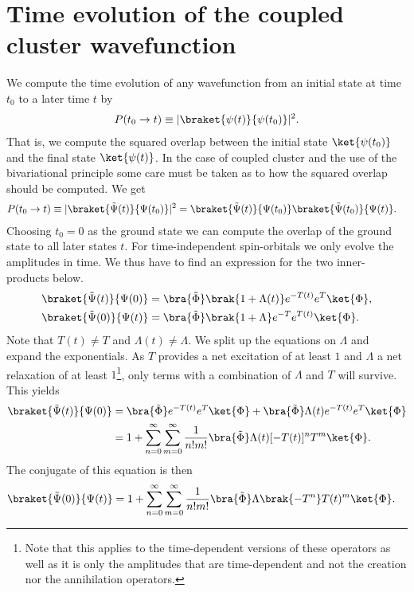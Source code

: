 \chapter{Time evolution of the coupled cluster wavefunction}
    We compute the time evolution of any wavefunction from an initial state at
    time $t_0$ to a later time $t$ by
    \begin{align}
        P(t_0 \to t)
        \equiv |\braket{\psi(t)}{\psi(t_0)}|^2.
    \end{align}
    That is, we compute the squared overlap between the initial state
    $\ket{\psi(t_0)}$ and the final state $\ket{\psi(t)}$. In the case of
    coupled cluster and the use of the bivariational principle some care must be
    taken as to how the squared overlap should be computed. We get
    \begin{align}
        P(t_0 \to t)
        &\equiv |\braket{\tilde{\Psi}(t)}{\Psi(t_0)}|^2
        = \braket{\tilde{\Psi}(t)}{\Psi(t_0)}
        \braket{\tilde{\Psi}(t_0)}{\Psi(t)}.
    \end{align}
    Choosing $t_0 = 0$ as the ground state we can compute the overlap of the
    ground state to all later states $t$. For time-independent spin-orbitals we
    only evolve the amplitudes in time. We thus have to find an expression for
    the two inner-products below.
    \begin{align}
        \braket{\tilde{\Psi}(t)}{\Psi(0)}
        &=
        \bra{\tilde{\Phi}}\brak{1 + \Lambda(t)}e^{-T(t)}
        e^{T}\ket{\Phi},
        \\
        \braket{\tilde{\Psi}(0)}{\Psi(t)}
        &=
        \bra{\tilde{\Phi}}\brak{1 + \Lambda}e^{-T}
        e^{T(t)}\ket{\Phi}.
    \end{align}
    Note that $T(t) \neq T$ and $\Lambda(t) \neq \Lambda$.  We split up the
    equations on $\Lambda$ and expand the exponentials. As $T$ provides a net
    excitation of at least $1$ and $\Lambda$ a net relaxation of at least
    $1$\footnote{Note that this applies to the time-dependent versions of these
    operators as well as it is only the amplitudes that are time-dependent and
    not the creation nor the annihilation operators.}, only terms with a
    combination of $\Lambda$ and $T$ will survive. This yields
    \begin{align}
        \braket{\tilde{\Psi}(t)}{\Psi(0)}
        &=
        \bra{\tilde{\Phi}}e^{-T(t)}e^T\ket{\Phi}
        +
        \bra{\tilde{\Phi}}\Lambda(t)e^{-T(t)}e^T\ket{\Phi}
        \\
        &=
        1
        + \sum_{n = 0}^{\infty}\sum_{m = 0}^{\infty}
        \frac{1}{n!m!}
        \bra{\tilde{\Phi}}\Lambda(t)[-T(t)]^nT^m\ket{\Phi}.
    \end{align}
    The conjugate of this equation is then
    \begin{align}
        \braket{\tilde{\Psi}(0)}{\Psi(t)}
        &=
        1 + \sum_{n = 0}^{\infty}\sum_{m = 0}^{\infty}
        \frac{1}{n!m!}
        \bra{\tilde{\Phi}}\Lambda \brak{-T^n} T(t)^m\ket{\Phi}.
    \end{align}


